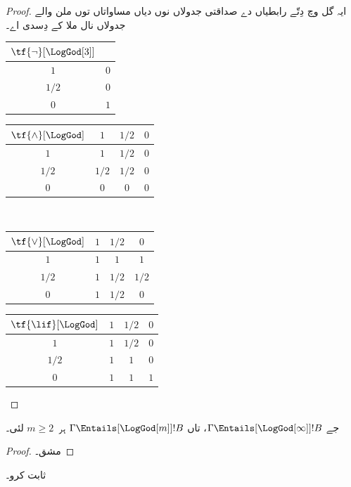 \documentclass[../../../include/open-logic-section]{subfiles}
\begin{document}
\begin{proof}
  ایہ گل  وچ دِتّے رابطیاں دے
  صداقتی جدولاں نوں  دیاں مساواتاں توں ملن
  والے جدولاں نال ملا کے دِسدی اے۔
  \begin{center}
    \begin{tabular}{c|c} 
      $\tf{\lnot}[\LogGod[3]]$ & \\ 
      \hline  
      $1$ & $0$ \\ 
      $1/2$ & $0$ \\
      $0$ & $1$ 
    \end{tabular}
    \quad
    \begin{tabular}{c|ccc} 
      $\tf{\land}[\LogGod]$ & $1$ & $1/2$ & $0$ \\ 
      \hline 
      $1$ & $1$ & $1/2$ & $0$ \\ 
      $1/2$ & $1/2$ & $1/2$ & $0$\\ 
      $0$ & $0$ & $0$ & $0$ 
    \end{tabular}
    \\[2ex]
    \begin{tabular}{c|ccc} 
      $\tf{\lor}[\LogGod]$ & $1$ & $1/2$ & $0$ \\ 
      \hline 
      $1$ & $1$ & $1$ & $1$ \\ 
      $1/2$ & $1$ & $1/2$ & $1/2$ \\
      $0$ & $1$ & $1/2$ & $0$ 
    \end{tabular}
    \quad
    \begin{tabular}{c|ccc} 
      $\tf{\lif}[\LogGod]$ & $1$ & $1/2$ & $0$ \\ 
      \hline 
      $1$ & $1$ & $1/2$ & $0$ \\ 
      $1/2$ & $1$ & $1$ & $0$  \\ 
      $0$ & $1$ & $1$ & $1$ 
    \end{tabular}
  \end{center}
\end{proof}

\begin{prop}
  جے $\Gamma \Entails[\LogGod[\infty]] !B$، تاں $\Gamma
  \Entails[\LogGod[m]] !B$ ہر~$m \ge 2$ لئی۔
\end{prop}

\begin{proof}
  مشق۔
\end{proof}

\begin{prob}
   ثابت کرو۔
\end{prob}
\end{document}

